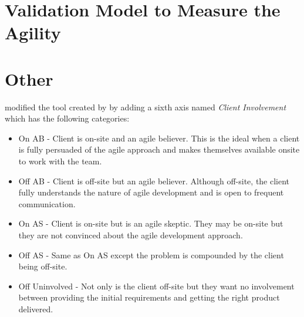 \section{Validation Model to Measure the Agility}


\section{Other}
\citet{taylor} modified the tool created by \citet{1231450} by adding a sixth axis named  \textit{Client Involvement} which has the following categories:

\begin{itemize}
\item On AB - Client is on-site and an agile believer. This is the ideal when a client is fully persuaded of the agile approach and makes themselves available onsite to work with the team.
\item Off AB - Client is off-site but an agile believer. Although off-site, the client fully understands the nature of agile development and is open to frequent communication.
\item On AS - Client is on-site but is an agile skeptic. They may be on-site but they are not convinced about the agile development approach.
\item Off AS - Same as On AS except the problem is compounded by the client being off-site.
\item Off Uninvolved - Not only is the client off-site but they want no involvement between providing the initial requirements and getting the right product delivered.
\end{itemize}

